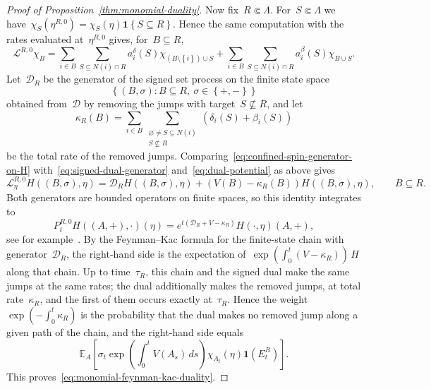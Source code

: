 \documentclass[EJP,preprint,NODS,nobera]{ejpecp}
\newcommand{\E}{\mathbb{E}}
\newcommand{\bb}[1]{\left(#1\right)}
\newcommand{\Cb}[1]{\left[#1\right]}
\newcommand{\cb}[1]{\left\{#1\right\}}
\newcommand{\ind}{\mathbf{1}}
\newcommand{\Lcal}{\mathcal{L}}
\newcommand{\Dcal}{\mathcal{D}}
\begin{document}
\begin{proof}[Proof of Proposition~\ref{thm:monomial-duality}]
Now fix~$R\Subset\Lambda$. For~$S\Subset\Lambda$ we
have~$\chi_S(\eta^{R,0})=\chi_S(\eta)\ind\cb{S\subseteq R}$. Hence the same
computation with the rates evaluated at~$\eta^{R,0}$ gives, for~$B\subseteq R$,
\begin{equation}
\label{eq:confined-spin-generator-on-H}
\Lcal^{R,0}\chi_B
=
\sum_{i\in B}
\sum_{S\subseteq N(i)\cap R}
a_i^\delta(S)
\chi_{\bb{B\setminus\cb{i}}\cup S}
+
\sum_{i\in B}
\sum_{S\subseteq N(i)\cap R}
a_i^\beta(S)
\chi_{B\cup S}.
\end{equation}
Let~$\Dcal_R$ be the generator of the signed set process on the finite
state space
\begin{equation*}
\cb{(B,\sigma):B\subseteq R,\ \sigma\in\cb{+,-}}
\end{equation*}
obtained from~$\Dcal$ by removing the jumps with target~$S\nsubseteq R$, and let
\begin{equation*}
\kappa_R(B)
=
\sum_{i\in B}
\sum_{\substack{\varnothing\neq S\subseteq N(i)\\S\nsubseteq R}}
\bb{\delta_i(S)+\beta_i(S)}
\end{equation*}
be the total rate of the removed jumps. Comparing~\eqref{eq:confined-spin-generator-on-H}
with~\eqref{eq:signed-dual-generator} and~\eqref{eq:dual-potential} as above gives
\begin{equation}
\label{eq:confined-generator-duality}
\Lcal_\eta^{R,0}H((B,\sigma),\eta)
=
\Dcal_RH((B,\sigma),\eta)
+
\bb{V(B)-\kappa_R(B)}H((B,\sigma),\eta),
\qquad B\subseteq R.
\end{equation}
Both generators are bounded operators on finite spaces, so this identity
integrates to
\begin{equation*}
P_t^{R,0}H((A,+),\cdot)(\eta)
=
e^{t\bb{\Dcal_R+V-\kappa_R}}H(\cdot,\eta)(A,+),
\end{equation*}
see for example~\cite{JansenKurt2014}. By the Feynman--Kac formula for the
finite-state chain with generator~$\Dcal_R$, the right-hand side is the
expectation of~$\exp\bb{\int_0^t(V-\kappa_R)}\,H$ along that chain. Up to
time~$\tau_R$, this chain and the signed dual make the same jumps at the same
rates; the dual additionally makes the removed jumps, at total
rate~$\kappa_R$, and the first of them occurs exactly at~$\tau_R$. Hence the
weight~$\exp\bb{-\int_0^t\kappa_R}$ is the probability that the dual makes no
removed jump along a given path of the chain, and the right-hand side
equals
\begin{equation*}
\E_A\Cb{\sigma_t\exp\bb{\int_0^tV(A_s)\,ds}\chi_{A_t}(\eta)\ind\bb{E_t^R}}.
\end{equation*}
This proves~\eqref{eq:monomial-feynman-kac-duality}.
\end{proof}
\end{document}
